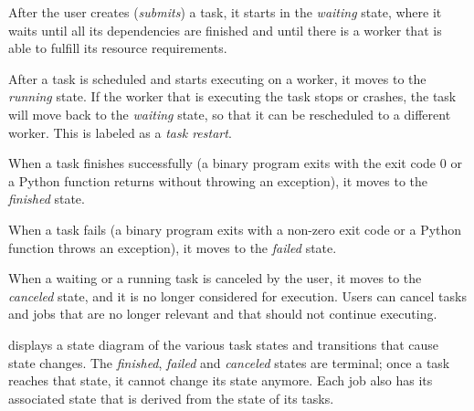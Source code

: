 \begin{description}[wide=0pt,itemsep=0pt,topsep=4pt]
	\item[Waiting] After the user creates (\emph{submits}) a task, it starts in the \emph{waiting}
		state, where it waits until all its dependencies are finished and until there is a worker that is
		able to fulfill its resource requirements.
	\item[Running] After a task is scheduled and starts executing on a worker, it moves to the \emph{running}
		state. If the worker that is executing the task stops or crashes, the task will move back to the
		\emph{waiting} state, so that it can be rescheduled to a different worker. This is labeled
		as a \emph{task restart}.
	\item[Finished] When a task finishes successfully (a binary program exits with the exit code $0$
		or a Python function returns without throwing an exception), it moves to the \emph{finished}
		state.
	\item[Failed] When a task fails (a binary program exits with a non-zero exit code or a Python function throws an
		exception), it moves to the \emph{failed} state.
	\item[Canceled] When a waiting or a running task is canceled by the user, it moves to the \emph{canceled}
		state, and it is no longer considered for execution. Users can cancel tasks and jobs that are no
		longer relevant and that should not continue executing.
\end{description}

 displays a state diagram of the various task states and
transitions that cause state changes. The \emph{finished}, \emph{failed} and
\emph{canceled} states are terminal; once a task reaches that state, it cannot change its
state anymore. Each job also has its associated state that is derived from the state of its tasks.

